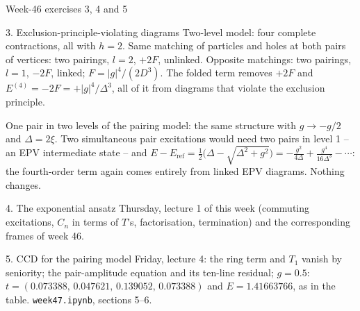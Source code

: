 \documentclass[aspectratio=169,10pt]{beamer}
\newcommand{\Eref}{E_{\mathrm{ref}}}
\begin{document}
\begin{frame}[shrink=13]{Week-46 exercises 3, 4 and 5}
\small
\begin{block}{3. Exclusion-principle-violating diagrams}
Two-level model: four complete contractions, all with $h=2$. Same matching of particles and holes at both pairs of vertices: two pairings, $l=2$, $+2F$, unlinked. Opposite matchings: two pairings, $l=1$, $-2F$, linked; $F=|g|^4/(2D^3)$. The folded term removes $+2F$ and $E^{(4)}=-2F=+|g|^4/\Delta^3$, all of it from diagrams that violate the exclusion principle.

One pair in two levels of the pairing model: the same structure with $g\to-g/2$ and $\Delta=2\xi$. Two simultaneous pair excitations would need two pairs in level 1 -- an EPV intermediate state -- and
$E-\Eref=\tfrac12\bigl(\Delta-\sqrt{\Delta^2+g^2}\bigr)=-\frac{g^2}{4\Delta}+\frac{g^4}{16\Delta^3}-\cdots$: the fourth-order term again comes entirely from linked EPV diagrams. Nothing changes.
\end{block}
\begin{block}{4. The exponential ansatz}
Thursday, lecture 1 of this week (commuting excitations, $C_n$ in terms of $T$'s, factorisation, termination) and the corresponding frames of week 46.
\end{block}
\begin{block}{5. CCD for the pairing model}
Friday, lecture 4: the ring term and $T_1$ vanish by seniority; the pair-amplitude equation and its ten-line residual; $g=0.5$: $t=(0.073388,\,0.047621,\,0.139052,\,0.073388)$ and $E=1.41663766$, as in the table. \texttt{week47.ipynb}, sections 5--6.
\end{block}
\end{frame}
\end{document}
